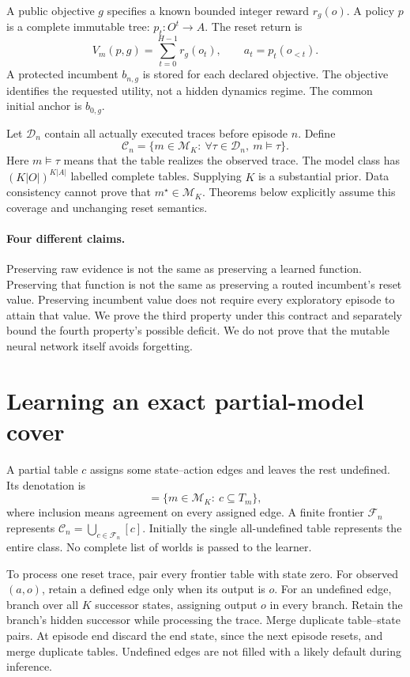 \documentclass[10pt,twocolumn]{article}
\newcommand{\C}{\mathcal C}
\newcommand{\M}{\mathcal M}
\newcommand{\F}{\mathcal F}
\newcommand{\D}{\mathcal D}
\begin{document}
A public objective $g$ specifies a known bounded integer reward $r_g(o)$.
A policy $p$ is a complete immutable tree: $p_t:O^t\to A$.
The reset return is
\begin{equation}
 V_m(p,g)=\sum_{t=0}^{H-1}r_g(o_t),\qquad
 a_t=p_t(o_{<t}).\label{eq:value}
\end{equation}
A protected incumbent $b_{n,g}$ is stored for each declared objective. The
objective identifies the requested utility, not a hidden dynamics regime.
The common initial anchor is $b_{0,g}$.

Let $\D_n$ contain all actually executed traces before episode $n$. Define
\begin{equation}
 \C_n=\{m\in\M_K:\ \forall\tau\in\D_n,\ m\models\tau\}.
 \label{eq:class}
\end{equation}
Here $m\models\tau$ means that the table realizes the observed trace.
The model class has $(K|O|)^{K|A|}$ labelled complete tables. Supplying $K$ is a
substantial prior. Data consistency cannot prove that $m^\star\in\M_K$.
Theorems below explicitly assume this coverage and unchanging reset semantics.

\paragraph{Four different claims.}
Preserving raw evidence is not the same as preserving a learned function.
Preserving that function is not the same as preserving a routed incumbent's
reset value. Preserving incumbent value does not require every exploratory
episode to attain that value. We prove the third property under this contract
and separately bound the fourth property's possible deficit. We do not prove
that the mutable neural network itself avoids forgetting.

\section{Learning an exact partial-model cover}
A partial table $c$ assigns some state--action edges and leaves the rest undefined.
Its denotation is
\begin{equation}
 [c]=\{m\in\M_K:\ c\subseteq T_m\},
\end{equation}
where inclusion means agreement on every assigned edge.
A finite frontier $\F_n$ represents $\C_n=\bigcup_{c\in\F_n}[c]$.
Initially the single all-undefined table represents the entire class.
No complete list of worlds is passed to the learner.

To process one reset trace, pair every frontier table with state zero.
For observed $(a,o)$, retain a defined edge only when its output is $o$.
For an undefined edge, branch over all $K$ successor states, assigning output
$o$ in every branch. Retain the branch's hidden successor while processing the
trace. Merge duplicate table--state pairs. At episode end discard the end state,
since the next episode resets, and merge duplicate tables. Undefined edges are
not filled with a likely default during inference.
\end{document}
